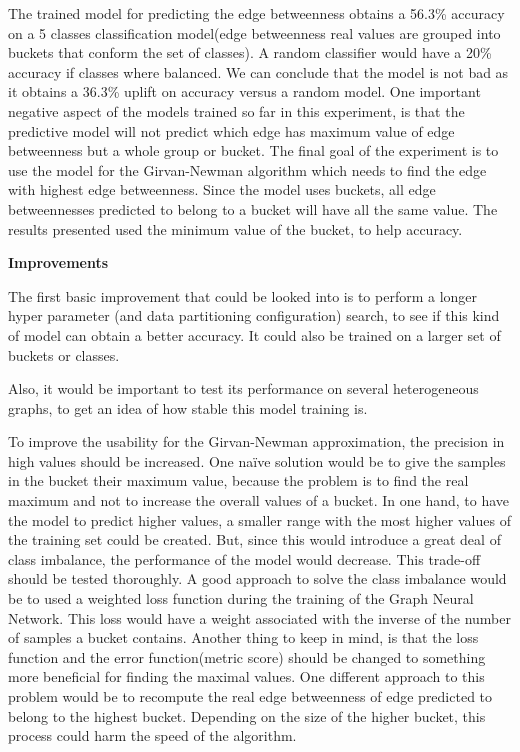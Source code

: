 The trained model for predicting the edge betweenness obtains a 56.3\% accuracy on a 5 classes classification model(edge betweenness real values are grouped into buckets that conform the set of classes). A random classifier would have a 20\% accuracy if classes where balanced. We can conclude that the model is not bad as it obtains a 36.3\% uplift on accuracy versus a random model.
One important negative aspect of the models trained so far in this experiment, is that the predictive model will not predict which edge has maximum value of edge betweenness but a whole group or bucket. The final goal of the experiment is to use the model for the Girvan-Newman algorithm which needs to find the edge with highest edge betweenness. Since the model uses buckets, all edge betweennesses predicted to belong to a bucket will have all the same value. The results presented used the minimum value of the bucket, to help accuracy.

\textbf{Improvements}

The first basic improvement that could be looked into is to perform a longer hyper parameter (and data partitioning configuration) search, to see if this kind of model can obtain a better accuracy. It could also be trained on a larger set of buckets or classes. 


Also, it would be important to test its performance on several heterogeneous graphs, to get an idea of how stable this model training is.


To improve the usability for the Girvan-Newman approximation, the precision in high values should be increased. One naïve solution would be to give the samples in the bucket their maximum value, because the problem is to find the real maximum and not to increase the overall values of a bucket. In one hand, to have the model to predict higher values, a smaller range with the most higher values of the training set could be created. But, since this would introduce a great deal of class imbalance, the performance of the model would decrease. This trade-off should be tested thoroughly. A good approach to solve the class imbalance would be to used a weighted loss function during the training of the Graph Neural Network. This loss would have a weight associated with the inverse of the number of samples a bucket contains. Another thing to keep in mind, is that the loss function and the error function(metric score) should be changed to something more beneficial for finding the maximal values. One different approach to this problem would be to recompute the real edge betweenness of edge predicted to belong to the highest bucket. Depending on the size of the higher bucket, this process could harm the speed of the algorithm.

